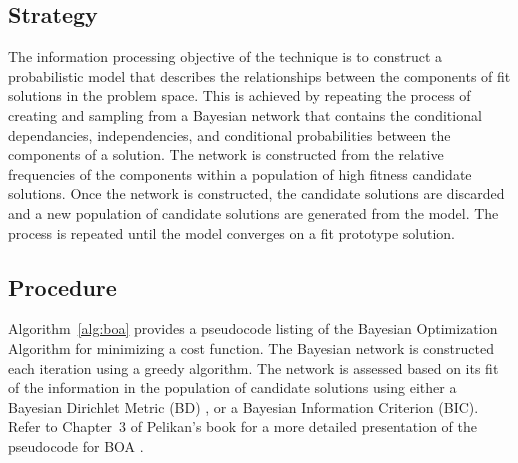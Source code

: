 \subsection{Strategy}
The information processing objective of the technique is to construct a probabilistic model that describes the relationships between the components of fit solutions in the problem space.
This is achieved by repeating the process of creating and sampling from a Bayesian network that contains the conditional dependancies, independencies, and conditional probabilities between the components of a solution. The network is constructed from the relative frequencies of the components within a population of high fitness candidate solutions. Once the network is constructed, the candidate solutions are discarded and a new population of candidate solutions are generated from the model. The process is repeated until the model converges on a fit prototype solution.

\subsection{Procedure}
Algorithm~\ref{alg:boa} provides a pseudocode listing of the Bayesian Optimization Algorithm for minimizing a cost function.
The Bayesian network is constructed each iteration using a greedy algorithm. The network is assessed based on its fit of the information in the population of candidate solutions using either a Bayesian Dirichlet Metric (BD) \cite{Pelikan1999a}, or a Bayesian Information Criterion (BIC). Refer to Chapter~3 of Pelikan's book for a more detailed presentation of the pseudocode for BOA \cite{Pelikan2005}.

